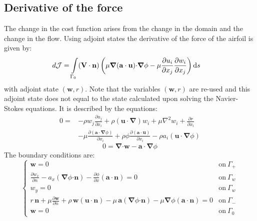 \documentclass[12pt, a4paper]{article}
\begin{document}
	\subsection{Derivative of the force}
		The change in the cost function arises from the change in the domain and the change in the flow. Using adjoint states the derivative of the force of the airfoil is given by:
        \begin{equation} \label{cost_derivative_definition}
        \begin{split}
            d \mathcal{J} = \int\limits_{\Gamma_0}(\mathbf{V \cdot n}) \, \bigg{(} &
                \mu \boldsymbol{\nabla}(\mathbf{a \cdot u}) \mathbf{\cdot} \boldsymbol{\nabla} \phi -
                \mu \frac{\partial u_i}{\partial x_j} \frac{\partial w_i}{\partial x_j}
            \bigg{)} \, \mathrm{d}s
        \end{split}
        \end{equation}
        with adjoint state $(\mathbf{w},r)$. Note that the variables $(\mathbf{w},r)$ are re-used and this adjoint state does not equal to the state calculated upon solving the Navier-Stokes equations. It is described by the equations:
        \begin{equation} \label{adj_velocity_definition}
        \begin{split}
            0 = & -\rho w_j \frac{\partial u_j}{\partial x_i} +
                \rho (\mathbf{u \cdot} \boldsymbol{\nabla}) w_i +
                \mu \nabla^2 w_i +
                \frac{\partial r}{\partial x_i} \\ 
            & -\mu \frac{\partial (\mathbf{a \cdot} \boldsymbol{\nabla} \phi)}{\partial x_i} +
                \rho \phi \frac{\partial (\mathbf{a \cdot u})}{\partial x_i} - 
            \rho a_i (\mathbf{u \cdot} \boldsymbol{\nabla} \phi)
        \end{split}
        \end{equation}
        \begin{equation} \label{adj_pressure_definition}
            0 = \boldsymbol{\nabla} \mathbf{\cdot w} - 
            \mathbf{a \cdot} \boldsymbol{\nabla} \phi
        \end{equation}
        The boundary conditions are:
        \begin{equation}
        \begin{cases}
            \mathbf{w} = 0	 	&	\text{on}\ \Gamma_+ \\
            \frac{\partial w_x}{\partial n} - a_x (\boldsymbol{\nabla} \phi \mathbf{\cdot n}) - 
            \frac{\partial \phi}{\partial x} (\mathbf{a \cdot n}) = 0	&	\text{on}\ \Gamma_w \\
            w_y = 0				&	\text{on}\ \Gamma_w \\
            r \, \mathbf{n} + \mu \frac{\partial \mathbf{w}}{\partial n} + \rho \, \mathbf{w} (\mathbf{u \cdot n}) - 
            \mu \, \mathbf{a} (\boldsymbol{\nabla} \phi \mathbf{\cdot n}) - 
            \mu \boldsymbol{\nabla} \phi (\mathbf{a \cdot n}) = 0	   	&	\text{on}\ \Gamma_- \\
            \mathbf{w} = 0	 	&	\text{on}\ \Gamma_0
        \end{cases}
        \end{equation}
\end{document}
